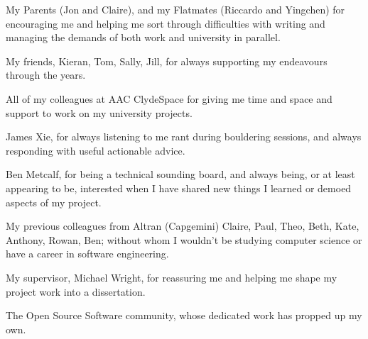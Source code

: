 \documentclass[../report.tex]{subfiles}
\begin{document}

My Parents (Jon and Claire), and my Flatmates (Riccardo and Yingchen) for
encouraging me and helping me sort through difficulties with writing and
managing the demands of both work and university in parallel.

My friends, Kieran, Tom, Sally, Jill, for always supporting my endeavours
through the years.

All of my colleagues at AAC ClydeSpace for giving me time and space and support
to work on my university projects.

James Xie, for always listening to me rant during bouldering sessions, and
always responding with useful actionable advice.

Ben Metcalf, for being a technical sounding board, and always being, or at
least appearing to be, interested when I have shared new things I learned or
demoed aspects of my project.

My previous colleagues from Altran (Capgemini) Claire, Paul, Theo, Beth, Kate,
Anthony, Rowan, Ben; without whom I wouldn't be studying computer science or
have a career in software engineering.

My supervisor, Michael Wright, for reassuring me and helping me shape my
project work into a dissertation.

The Open Source Software community, whose dedicated work has propped up my own.
\end{document}
